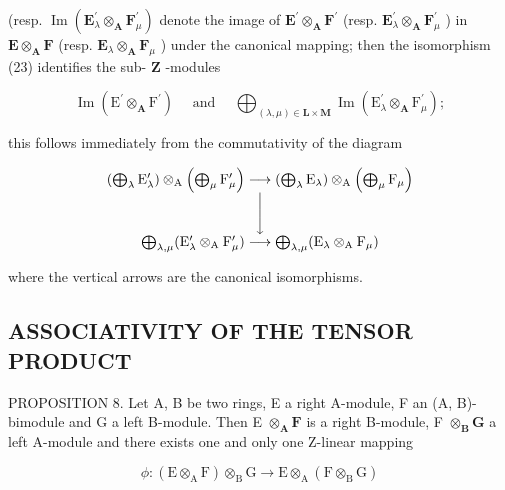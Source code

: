 (resp. \(\operatorname{Im}(\mathbf{E}_{\lambda}^{\prime}\otimes_{\mathbf{A}}\mathbf{F}_{\mu}^{\prime})\) denote the image of \(\mathbf{E}^{\prime}\otimes_{\mathbf{A}}\mathbf{F}^{\prime}\) (resp. \(\mathbf{E}_{\lambda}^{\prime}\otimes_{\mathbf{A}}\mathbf{F}_{\mu}^{\prime}\) ) in \(\mathbf{E}\otimes_{\mathbf{A}}\mathbf{F}\) (resp. \(\mathbf{E}_{\lambda}\otimes_{\mathbf{A}}\mathbf{F}_{\mu}\) ) under the canonical mapping; then the isomorphism (23) identifies the sub- \(\mathbf{Z}\) -modules

\[
\operatorname{Im} \left(\mathrm{E} ^ {\prime} \otimes_ {\mathbf {A}} \mathrm{F} ^ {\prime}\right) \quad \text { and } \quad \bigoplus_ {(\lambda , \mu) \in \mathbf {L} \times \mathbf {M}} \operatorname{Im} \left(\mathrm{E} _ {\lambda} ^ {\prime} \otimes_ {\mathbf {A}} \mathrm{F} _ {\mu} ^ {\prime}\right);
\]

this follows immediately from the commutativity of the diagram

\[
\begin{array}{c} \left(\bigoplus_ {\lambda} \mathrm{E} _ {\lambda} ^ {\prime}\right) \otimes_ {\mathrm{A}} \left(\bigoplus_ {\mu} \mathrm{F} _ {\mu} ^ {\prime}\right) \longrightarrow \left(\bigoplus_ {\lambda} \mathrm{E} _ {\lambda}\right) \otimes_ {\mathrm{A}} \left(\bigoplus_ {\mu} \mathrm{F} _ {\mu}\right) \\ \Biggl \downarrow \\ \bigoplus_ {\lambda , \mu} (\mathrm{E} _ {\lambda} ^ {\prime} \otimes_ {\mathrm{A}} \mathrm{F} _ {\mu} ^ {\prime}) \longrightarrow \bigoplus_ {\lambda , \mu} (\mathrm{E} _ {\lambda} \otimes_ {\mathrm{A}} \mathrm{F} _ {\mu}) \end{array}
\]

where the vertical arrows are the canonical isomorphisms.

\subsection{ASSOCIATIVITY OF THE TENSOR PRODUCT}

PROPOSITION 8. Let A, B be two rings, E a right A-module, F an (A, B)-bimodule and G a left B-module. Then E \(\otimes_{\mathbf{A}} \mathbf{F}\) is a right B-module, F \(\otimes_{\mathbf{B}} \mathbf{G}\) a left A-module and there exists one and only one Z-linear mapping

\[
\phi : (\mathrm{E} \otimes_ {\mathrm{A}} \mathrm{F}) \otimes_ {\mathrm{B}} \mathrm{G} \rightarrow \mathrm{E} \otimes_ {\mathrm{A}} (\mathrm{F} \otimes_ {\mathrm{B}} \mathrm{G})
\]

